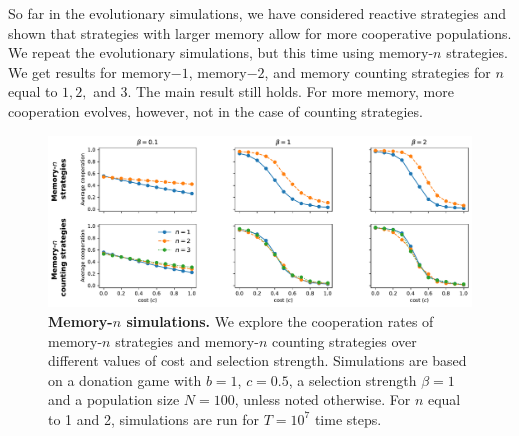 \documentclass[11pt]{article}
\theoremstyle{plainCl1}
\theoremstyle{plainCl2}
\begin{document}
So far in the evolutionary simulations, we have considered reactive strategies
and shown that strategies with larger memory allow for more cooperative
populations. We repeat the evolutionary simulations, but this time using
memory-$n$ strategies. We get results for memory$-1$, memory$-2$, and memory counting
strategies for $n$ equal to $1, 2,$ and $3$. The main result still holds. For
more memory, more cooperation evolves, however, not in the case of counting
strategies.


\begin{figure}[h]
  \centering
  \includegraphics[width=.75\textwidth]{../../figures/siFigMemorySim.pdf}
  \caption{
  \textbf{Memory-$n$ simulations.}
  We explore the cooperation rates of memory-$n$ strategies and memory-$n$
  counting strategies over different values of cost and selection strength.
  Simulations are based on a donation game with \(b\!=\!1\),  \(c\!=\!0.5\), a
  selection strength $\beta\!=\!1$ and a population size $N\!=\!100$, unless
  noted otherwise. For $n$ equal to 1 and 2, simulations are run for \(T\!=\! 10
  ^ 7\) time steps.
  }
\end{figure}
\end{document}
